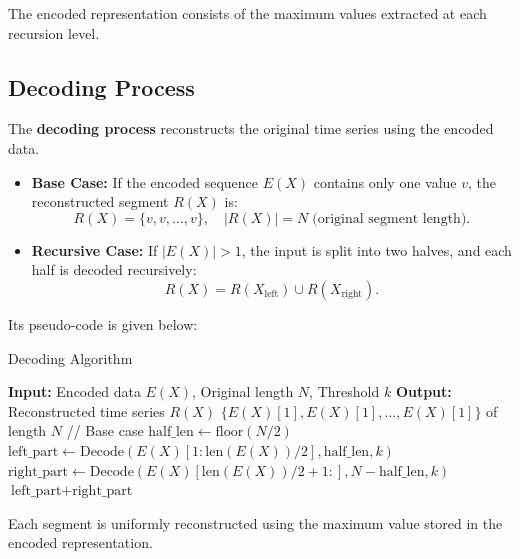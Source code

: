 \documentclass[onecolumn,conference]{IEEEtran}
\begin{document}
The encoded representation consists of the maximum values extracted at each recursion level.

\subsection{Decoding Process}
The \textbf{decoding process} reconstructs the original time series using the encoded data.
\begin{itemize}
    \item \textbf{Base Case:} If the encoded sequence \( E(X) \) contains only one value \( v \), the reconstructed segment \( R(X) \) is:
    \[
    R(X) = \{v, v, \dots, v\}, \quad |R(X)| = N \; \text{(original segment length)}.
    \]
    \item \textbf{Recursive Case:} If \( |E(X)| > 1 \), the input is split into two halves, and each half is decoded recursively:
    \[
    R(X) = R(X_{\text{left}}) \cup R(X_{\text{right}}).
    \]
\end{itemize}
Its pseudo-code is given below:
\begin{algorithm}[H] %
\caption{Decoding Algorithm}
\label{alg:decoding}
\begin{algorithmic}[1]
\STATE \textbf{Input:} Encoded data $E(X)$, Original length $N$, Threshold $k$
\STATE \textbf{Output:} Reconstructed time series $R(X)$
\STATE
{}
    \RETURN $\{E(X)[1], E(X)[1], \dots, E(X)[1]\}$ of length $N$ \hfill // Base case
\ENDIF
\STATE $\text{half\_len} \gets \text{floor}(N/2)$
\STATE $\text{left\_part} \gets \text{Decode}(E(X)[1:\text{len}(E(X))/2], \text{half\_len}, k)$
\STATE $\text{right\_part} \gets \text{Decode}(E(X)[\text{len}(E(X))/2+1:], N - \text{half\_len}, k)$
\RETURN $\text{left\_part} + \text{right\_part}$
\end{algorithmic}
\end{algorithm}

Each segment is uniformly reconstructed using the maximum value stored in the encoded representation.
\end{document}
